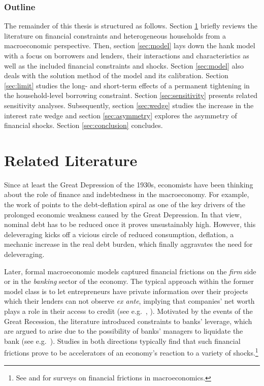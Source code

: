 \documentclass[a4paper,12pt]{article} %
\numberwithin{equation}{section} %
\numberwithin{figure}{section}
\numberwithin{table}{section}
\begin{document}
\subsubsection*{Outline}
\label{sec:outline}
The remainder of this thesis is structured as follows. Section \ref{sec:literature} briefly reviews the literature on financial constraints and heterogeneous households from a macroeconomic perspective. Then, section \ref{sec:model} lays down the \Gls{hank} model with a focus on borrowers and lenders, their interactions and characteristics as well as the included financial constraints and shocks. Section \ref{sec:model} also deals with the solution method of the model and its calibration. Section \ref{sec:limit} studies the long- and short-term effects of a permanent tightening in the household-level borrowing constraint. Section \ref{sec:sensitivity} presents related sensitivity analyses. Subsequently, section \ref{sec:wedge} studies the increase in the interest rate wedge and section \ref{sec:asymmetry} explores the asymmetry of financial shocks. Section \ref{sec:conclusion} concludes.

\section{Related Literature}
\label{sec:literature}

Since at least the Great Depression of the 1930s, economists have been thinking about the role of finance and indebtedness in the macroeconomy. For example, the work of \textcite{fisher1933} points to the debt-deflation spiral as one of the key drivers of the prolonged economic weakness caused by the Great Depression. In that view, nominal debt has to be reduced once it proves unsustainably high. However, this deleveraging kicks off a vicious circle of reduced consumption, deflation, a mechanic increase in the real debt burden, which finally aggravates the need for deleveraging.

Later, formal macroeconomic models captured financial frictions on the \textit{firm} side or in the \textit{banking} sector of the economy. The typical approach within the former model class is to let entrepreneurs have private information over their projects which their lenders can not observe \textit{ex ante}, implying that companies' net worth plays a role in their access to credit (see e.g.~\cite{bg1989}, \cite{bgg1999}). Motivated by the events of the Great Recession, the literature introduced constraints to banks' leverage, which are argued to arise due to the possibility of banks' managers to liquidate the bank (see e.g.~\cite{gertler2011}). Studies in both directions typically find that such financial frictions prove to be accelerators of an economy's reaction to a variety of shocks.\footnote{See \textcite{brunnermeier2012} and \textcite{christiano2022} for surveys on financial frictions in macroeconomics.}
\end{document}

